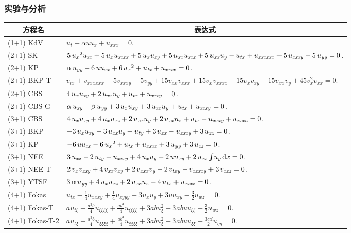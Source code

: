 \begin{frame}
\frametitle{实验与分析}
\footnotesize
\begin{table}[htbp]
\centering
\begin{tabular}{lp{}}
\hline
\multicolumn{1}{c}{方程名} & \multicolumn{1}{c}{表达式} \\
\hline
(1+1) KdV & $ u_t+\alpha uu_x+u_{xxx}=0.$\\
(2+1) SK & $5\,{u_{{x}}}^{2}u_{{{\it xx}}}+5\,u_{{x}}u_{{{\it xxxx}}}+5\,u_{{x}}u_{{{\it xy}}}+5\,u_{{{\it xx}}}u_{{{\it xxx}}}+5\,u_{{{\it xx}}}u_{{y}}-u_{{{\it tx}}}+u_{{{\it xxxxxx}}}+5\,u_{{{\it xxxy}}}-5\,u_{{{\it yy}}}=0$.\\
(2+1) KP & $\alpha\,u_{{{\it yy}}}+6\,uu_{{{\it xx}}}+6\,{u_{{x}}}^{2}+u_{{{\it tx}}}+u_{{{\it xxxx}}}=0$.\\
(2+1) BKP-T & $v_{tx}+v_{xxxxxx}-5v_{xxxy}-5v_{yy}+15v_{xx}v_{xxx}+15v_xv_{xxxx}-15v_xv_{xy}-15v_{xx}v_y+45v_x^2v_{xx}=0$. \\
(2+1) CBS & $4\,u_{{x}}u_{{{\it xy}}}+2\,u_{{{\it xx}}}u_{{y}}+u_{{{\it tx}}}+u_{{{\it xxxy}}}=0$.\\
(2+1) CBS-G & $\alpha\,u_{{{\it xy}}}+\beta\,u_{{{\it yy}}}+3\,u_{{x}}u_{{{\it xy}}}+3\,u_{{{\it xx}}}u_{{y}}+u_{{{\it tx}}}+u_{{{\it xxxy}}}=0$.\\
(3+1) CBS & $4\,u_{{x}}u_{{{\it xy}}}+4\,u_{{x}}u_{{{\it xz}}}+2\,u_{{{\it xx}}}u_{{y}}+2\,u_{{{\it xx}}}u_{{z}}+u_{{{\it tx}}}+u_{{{\it xxxy}}}+u_{{{\it xxxz}}}=0$.\\
(3+1) BKP & $-3\,u_{{x}}u_{{{\it xy}}}-3\,u_{{{\it xx}}}u_{{y}}+u_{{{\it ty}}}+3\,u_{{{\it xx}}}-u_{{{\it xxxy}}}+3\,u_{{{\it zz}}}=0$.\\
(3+1) KP & $-6\,uu_{{{\it xx}}}-6\,{u_{{x}}}^{2}+u_{{{\it tx}}}+u_{{{\it xxxx}}}+3\,u_{{{\it yy}}}+3\,u_{{{\it zz}}}=0$.\\
(3+1) NEE & $3\,u_{{{\it xz}}}-2\,u_{{{\it ty}}}-u_{{{\it xxxy}}}+4\,u_{{x}}u_{{y}}+2\,uu_{{{\it xy}}}+2\,u_{{{\it xx}}}\int \!u_{{y}}\,{\rm d}x=0$.\\
(3+1) NEE-T & $2\,v_{{x}}v_{{{\it xxy}}}+4\,v_{{{\it xx}}}v_{{{\it xy}}}+2\,v_{{{\it xxx}}}v_{{y}}-2\,v_{{{\it txy}}}-v_{{{\it xxxxy}}}+3\,v_{{{\it xxz}}}=0$.\\
(3+1) YTSF & $3\,\alpha\,u_{{{\it yy}}}+4\,u_{{x}}u_{{{\it xz}}}+2\,u_{{{\it xx}}}u_{{z}}-4\,u_{{{\it tx}}}+u_{{{\it xxxz}}}=0$.\\
(4+1) Fokas & $u_{tx}-\frac{1}{4}u_{xxxy}+\frac{1}{4}u_{xyyy}+3u_xu_y+3uu_{xy}-\frac{3}{2}u_{wz}=0.$ \\
(4+1) Fokas-T & $au_{t\xi}-\frac{a^3b}{4}u_{\xi\xi\xi\xi}+\frac{ab^3}{4}u_{\xi\xi\xi\xi}+3abu_{\xi}^2+3abuu_{\xi\xi}-\frac{3}{2}u_{wz}=0.$  \\ 
(4+1) Fokas-T-2 & $au_{t\xi}-\frac{a^3b}{4}u_{\xi\xi\xi\xi}+\frac{ab^3}{4}u_{\xi\xi\xi\xi}+3abu_{\xi}^2+3abuu_{\xi\xi}-\frac{3cd}{2}u_{\eta\eta}=0.$\\
\hline
\end{tabular}
\end{table}
\end{frame}
